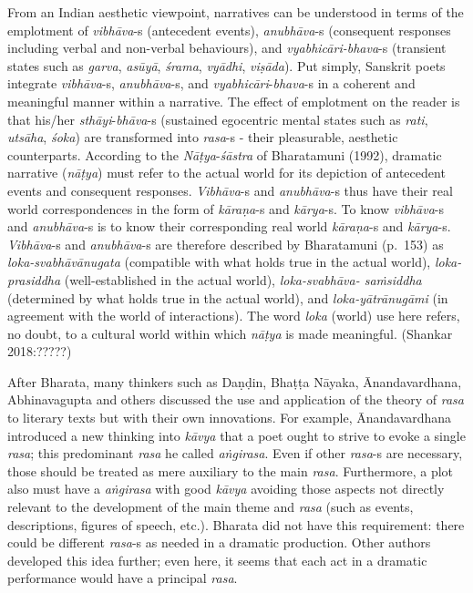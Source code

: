\begin{myquote}
From an Indian aesthetic viewpoint, narratives can be understood in terms of the emplotment of \textsl{vibhāva}-s (antecedent events), \textsl{anubhāva}-s (consequent responses including verbal and non-verbal behaviours), and \textsl{vyabhicāri-bhava}-s (transient states such as \textsl{garva}, \textsl{asūyā}, \textsl{śrama}, \textsl{vyādhi}, \textsl{viṣāda}). Put simply, Sanskrit poets integrate \textsl{vibhāva}-s, \textsl{anubhāva}-s, and \textsl{vyabhicāri}-\textsl{bhava}-s in a coherent and meaningful manner within a narrative. The effect of emplotment on the reader is that his/her \textsl{sthāyi}-\textsl{bhāva}-s (sustained egocentric mental states such as \textsl{rati}, \textsl{utsāha}, \textsl{śoka}) are transformed into \textsl{rasa}-s - their pleasurable, aesthetic counterparts. According to the \textsl{Nāṭya}-\textsl{śāstra} of Bharatamuni (1992), dramatic narrative (\textsl{nāṭya}) must refer to the actual world for its depiction of antecedent events and consequent responses. \textsl{Vibhāva}-s and \textsl{anubhāva}-s thus have their real world correspondences in the form of \textsl{kāraṇa}-s and \textsl{kārya}-s. To know \textsl{vibhāva}-s and \textsl{anubhāva}-s is to know their corresponding real world \textsl{kāraṇa}-s and \textsl{kārya}-s. \textsl{Vibhāva}-s and \textsl{anubhāva}-s are therefore described by Bharatamuni (p.~153) as \textsl{loka-svabhāvānugata} (compatible with what holds true in the actual world), \textsl{loka-prasiddha} (well-established in the actual world), \textsl{loka-svabhāva- saṁsiddha} (determined by what holds true in the actual world), and \textsl{loka-yātrānugāmi} (in agreement with the world of interactions). The word \textsl{loka} (world) use here refers, no doubt, to a cultural world within which \textsl{nāṭya} is made meaningful. 
\hfill(Shankar 2018:?????) 
\end{myquote}

After Bharata, many thinkers such as Daṇḍin, Bhaṭṭa Nāyaka, Ānandavardhana, Abhinavagupta and others discussed the use and application of the theory of \textsl{rasa} to literary texts but with their own innovations. For example, Ānandavardhana introduced a new thinking into \textsl{kāvya} that a poet ought to strive to evoke a single \textsl{rasa}; this predominant \textsl{rasa} he called \textsl{aṅgirasa}. Even if other \textsl{rasa}-s are necessary, those should be treated as mere auxiliary to the main \textsl{rasa}. Furthermore, a plot also must have a \textsl{aṅgirasa} with good \textsl{kāvya} avoiding those aspects not directly relevant to the development of the main theme and \textsl{rasa} (such as events, descriptions, figures of speech, etc.). Bharata did not have this requirement: there could be different \textsl{rasa}-s as needed in a dramatic production. Other authors developed this idea further; even here, it seems that each act in a dramatic performance would have a principal \textsl{rasa}. 

